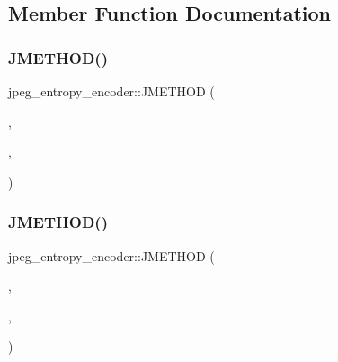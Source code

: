 \subsection{Member Function Documentation}
\mbox{\label{structjpeg__entropy__encoder_aa42cc97f950746e53857b958e00519dd}} 
\subsubsection{\texorpdfstring{JMETHOD()}{JMETHOD()}\hspace{0.1cm}{\footnotesize\ttfamily [1/3]}}
{\footnotesize\ttfamily jpeg\+\_\+entropy\+\_\+encoder\+::\+J\+M\+E\+T\+H\+OD (\begin{DoxyParamCaption}\item[{void}]{,  }\item[{\mbox{\hyperlink{jddctmgr_8c_a1964f006adb8fb80f57e455f6452aec1}{start\+\_\+pass}}}]{,  }\item[{(\mbox{\hyperlink{jpeglib_8h_add2a072c54e3a51550f4975f7ddb91e7}{j\+\_\+compress\+\_\+ptr}} cinfo, \mbox{\hyperlink{jmorecfg_8h_a7c6368b321bd9acd0149b030bb8275ed}{boolean}} gather\+\_\+statistics)}]{ }\end{DoxyParamCaption})}

\mbox{\label{structjpeg__entropy__encoder_a6852c01b9a63cceaae5f1d0e4ef1185a}} 
\subsubsection{\texorpdfstring{JMETHOD()}{JMETHOD()}\hspace{0.1cm}{\footnotesize\ttfamily [2/3]}}
{\footnotesize\ttfamily jpeg\+\_\+entropy\+\_\+encoder\+::\+J\+M\+E\+T\+H\+OD (\begin{DoxyParamCaption}\item[{\mbox{\hyperlink{jmorecfg_8h_a7c6368b321bd9acd0149b030bb8275ed}{boolean}}}]{,  }\item[{\mbox{\hyperlink{jcarith_8c_a72e97499e846635676b53db9977b4a5a}{encode\+\_\+mcu}}}]{,  }\item[{(\mbox{\hyperlink{jpeglib_8h_add2a072c54e3a51550f4975f7ddb91e7}{j\+\_\+compress\+\_\+ptr}} cinfo, \mbox{\hyperlink{jpeglib_8h_a04dea0959d9bd9e8ddad83597161453b}{J\+B\+L\+O\+C\+K\+R\+OW}} $\ast$M\+C\+U\+\_\+data)}]{ }\end{DoxyParamCaption})}

